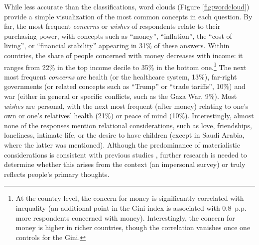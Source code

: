 \documentclass[12pt,english]{article}
\begin{document}
While less accurate than the classifications, word clouds (Figure \ref{fig:wordcloud}) provide a simple visualization of the most common concepts in each question. By far, the most frequent \textit{concerns} or \textit{wishes} of respondents relate to their purchasing power, with concepts such as ``money'', ``inflation'', the ``cost of living'', or ``financial stability'' appearing in 31\% of these answers. Within countries, the share of people concerned with money decreases with income: it ranges from 22\% in the top income decile to 35\% in the bottom one.\footnote{At the country level, the concern for money is significantly correlated with inequality (an additional point in the Gini index is associated with 0.8~p.p. more respondents concerned with money). %
Interestingly, the concern for money is higher in richer countries, though the correlation vanishes once one controls for the Gini.} 
The next most frequent \textit{concerns} are health (or the healthcare system, 13\%), far-right governments (or related concepts such as ``Trump'' or ``trade tariffs'', 10\%) and war (either in general or specific conflicts, such as the Gaza War, 9\%). Most \textit{wishes} are personal, with the next most frequent (after money) relating to one's own or one's relatives' health (21\%) or peace of mind (10\%). Interestingly, almost none of the responses mention relational considerations, such as love, friendships, loneliness, intimate life, or the desire to have children (except in Saudi Arabia, where the latter was mentioned). %
Although the predominance of materialistic considerations is consistent with previous studies \citep{wlezien_salience_2005,singer_who_2011}, further research is needed to determine whether this arises from the context (an impersonal survey) or truly reflects people's primary thoughts. 
\end{document}
